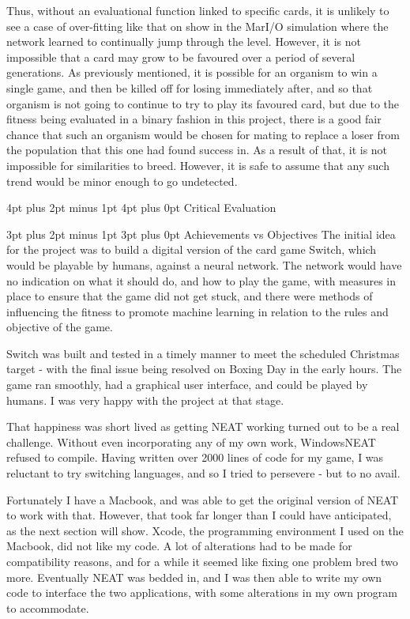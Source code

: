 \documentclass[12pt,a4paper]{article}
\makeatletter
\renewcommand\subsection{\@startsection {subsection}{1}{2mm} %
                               {3pt plus 2pt minus 1pt} %
                               {3pt plus 0pt} %
                               {\normalfont\bfseries}}
\renewcommand\section{\@startsection {section}{1}{0mm} %
                               {4pt plus 2pt minus 1pt} %
                               {4pt plus 0pt} %
                               {\bfseries}}
\makeatother
\begin{document}
Thus, without an evaluational function linked to specific cards, it is unlikely to see a case of over-fitting like that on show in the MarI/O simulation where the network learned to continually jump through the level. However, it is not impossible that a card may grow to be favoured over a period of several generations. As previously mentioned, it is possible for an organism to win a single game, and then be killed off for losing immediately after, and so that organism is not going to continue to try to play its favoured card, but due to the fitness being evaluated in a binary fashion in this project, there is a good fair chance that such an organism would be chosen for mating to replace a loser from the population that this one had found success in. As a result of that, it is not impossible for similarities to breed. However, it is safe to assume that any such trend would be minor enough to go undetected. 

\newpage
\section{Critical Evaluation}

\subsection{Achievements vs Objectives}
The initial idea for the project was to build a digital version of the card game Switch, which would be playable by humans, against a neural network. The network would have no indication on what it should do, and how to play the game, with measures in place to ensure that the game did not get stuck, and there were methods of influencing the fitness to promote machine learning in relation to the rules and objective of the game. 

Switch was built and tested in a timely manner to meet the scheduled Christmas target - with the final issue being resolved on Boxing Day in the early hours. The game ran smoothly, had a graphical user interface, and could be played by humans. I was very happy with the project at that stage. 

That happiness was short lived as getting NEAT working turned out to be a real challenge. Without even incorporating any of my own work, WindowsNEAT refused to compile. Having written over 2000 lines of code for my game, I was reluctant to try switching languages, and so I tried to persevere - but to no avail. 

Fortunately I have a Macbook, and was able to get the original version of NEAT to work with that. However, that took far longer than I could have anticipated, as the next section will show. Xcode, the programming environment I used on the Macbook, did not like my code. A lot of alterations had to be made for compatibility reasons, and for a while it seemed like fixing one problem bred two more. Eventually NEAT was bedded in, and I was then able to write my own code to interface the two applications, with some alterations in my own program to accommodate. 
\end{document}

